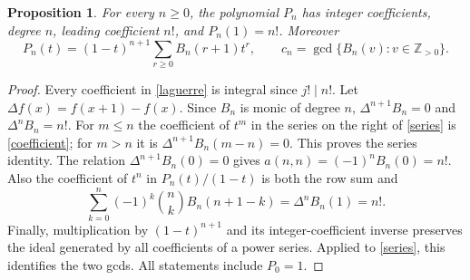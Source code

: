 \documentclass[11pt]{article}
\newtheorem{proposition}[theorem]{Proposition}
\begin{document}
\begin{proposition}\label{properties}
For every $n\geq0$, the polynomial $P_n$ has integer coefficients, degree
$n$, leading coefficient $n!$, and $P_n(1)=n!$. Moreover
\begin{equation}\label{series}
 P_n(t)=(1-t)^{n+1}\sum_{r\geq0}B_n(r+1)t^r,
 \qquad
 c_n=\gcd\{B_n(v):v\in\mathbb Z_{>0}\}.
\end{equation}
\end{proposition}
\begin{proof}
Every coefficient in \eqref{laguerre} is integral since $j!\mid n!$.
Let $\Delta f(x)=f(x+1)-f(x)$. Since $B_n$ is monic of degree $n$,
$\Delta^{n+1}B_n=0$ and $\Delta^n B_n=n!$.
For $m\leq n$ the coefficient of $t^m$ in the series on the right of
\eqref{series} is \eqref{coefficient}; for $m>n$ it is
$\Delta^{n+1}B_n(m-n)=0$. This proves the series identity.
The relation $\Delta^{n+1}B_n(0)=0$ gives
$a(n,n)=(-1)^n B_n(0)=n!$.
Also the coefficient of $t^n$ in $P_n(t)/(1-t)$ is both the row sum and
\[
 \sum_{k=0}^n(-1)^k\binom nk B_n(n+1-k)=\Delta^n B_n(1)=n!.
\]
Finally, multiplication by $(1-t)^{n+1}$ and its integer-coefficient
inverse preserves the ideal generated by all coefficients of a power
series. Applied to \eqref{series}, this identifies the two gcds.
All statements include $P_0=1$.
\end{proof}
\end{document}
